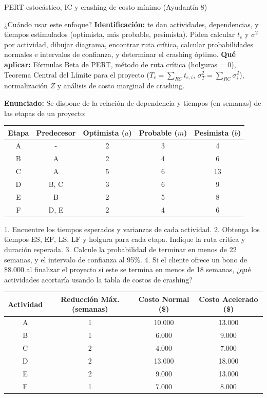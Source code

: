 \begin{ejercicio}{PERT estocástico, IC y crashing de costo mínimo (Ayudantía 8)}
\begin{tipprueba}{¿Cuándo usar este enfoque?}
\textbf{Identificación:} te dan actividades, dependencias, y tiempos estimulados (optimista, más probable, pesimista). Piden calcular $t_e$ y $\sigma^2$ por actividad, dibujar diagrama, encontrar ruta crítica, calcular probabilidades normales e intervalos de confianza, y determinar el crashing óptimo.
\textbf{Qué aplicar:} Fórmulas Beta de PERT, método de ruta crítica (holguras = 0), Teorema Central del Límite para el proyecto ($T_e = \sum_{RC} t_{e,i}$, $\sigma_T^2 = \sum_{RC} \sigma_i^2$), normalización $Z$ y análisis de costo marginal de crashing.
\end{tipprueba}

\textbf{Enunciado:}
Se dispone de la relación de dependencia y tiempos (en semanas) de las etapas de un proyecto:
\begin{center}
\small
\begin{tabular}{@{}ccccc@{}}
  \toprule
  \textbf{Etapa} & \textbf{Predecesor} & \textbf{Optimista ($a$)} & \textbf{Probable ($m$)} & \textbf{Pesimista ($b$)} \\
  \midrule
  A & - & 2 & 3 & 4 \\
  B & A & 2 & 4 & 6 \\
  C & A & 5 & 6 & 13 \\
  D & B, C & 3 & 6 & 9 \\
  E & B & 2 & 5 & 8 \\
  F & D, E & 2 & 4 & 6 \\
  \bottomrule
\end{tabular}
\end{center}
1. Encuentre los tiempos esperados y varianzas de cada actividad.
2. Obtenga los tiempos ES, EF, LS, LF y holgura para cada etapa. Indique la ruta crítica y duración esperada.
3. Calcule la probabilidad de terminar en menos de 22 semanas, y el intervalo de confianza al 95\%.
4. Si el cliente ofrece un bono de \$8.000 al finalizar el proyecto si este se termina en menos de 18 semanas, ¿qué actividades acortaría usando la tabla de costos de crashing?
\begin{center}
\small
\begin{tabular}{@{}cccc@{}}
  \toprule
  \textbf{Actividad} & \textbf{Reducción Máx. (semanas)} & \textbf{Costo Normal (\$)} & \textbf{Costo Acelerado (\$)} \\
  \midrule
  A & 1 & 10.000 & 13.000 \\
  B & 1 & 6.000 & 9.000 \\
  C & 2 & 4.000 & 7.000 \\
  D & 2 & 13.000 & 18.000 \\
  E & 2 & 9.000 & 13.000 \\
  F & 1 & 7.000 & 8.000 \\
  \bottomrule
\end{tabular}
\end{center}


\end{ejercicio}

